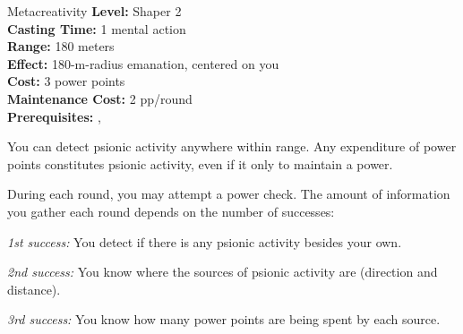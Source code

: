 {Metacreativity}
{
	\textbf{Level:}
	Shaper 2\\
	\textbf{Casting Time:}
	1 mental action\\
	\textbf{Range:}
	180 meters\\
	\textbf{Effect:}
	180-m-radius emanation, centered on you\\
	\textbf{Cost:}
	3 power points\\
	\textbf{Maintenance Cost:}
	2 pp/round\\
	\textbf{Prerequisites:}
	, \\
}
{
	You can detect psionic activity anywhere within range. Any expenditure of power points constitutes psionic activity, even if it only to maintain a power.

	During each round, you may attempt a power check. The amount of information you gather each round depends on the number of successes:

	\textit{1st success:} You detect if there is any psionic activity besides your own.

	\textit{2nd success:} You know where the sources of psionic activity are (direction and distance).

	\textit{3rd success:} You know how many power points are being spent by each source.
}